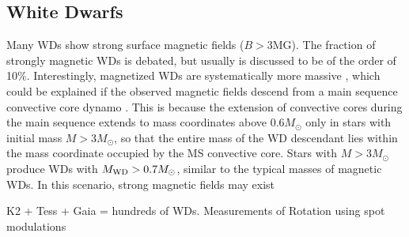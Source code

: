 {\color{red} \subsection{White Dwarfs}}
Many WDs show strong surface magnetic fields ($B>$3MG). The fraction of strongly magnetic WDs is debated, but usually is discussed to be of the order of 10\%. Interestingly, magnetized WDs are systematically more massive \cite{Ferrario_2015}, which could be explained if the observed magnetic fields descend from a main sequence convective core dynamo \cite{Cantiello_2016}. This is because the extension of convective cores during the main sequence extends to mass coordinates above 0.6$M_\odot$ only in stars with initial mass $M>3M_\odot$, so that the entire mass of the WD descendant lies within the mass coordinate occupied by the MS convective core. Stars with $M>3M_\odot$ produce WDs with $M_{\rm WD}>0.7M_\odot$, similar to the typical masses of magnetic WDs. In this scenario, strong magnetic fields may exist 

K2 + Tess + Gaia = hundreds of WDs. Measurements of Rotation using spot modulations